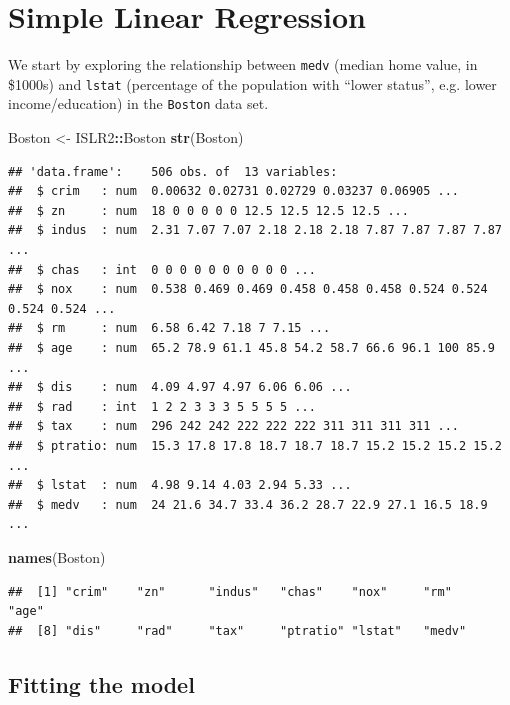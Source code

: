 \documentclass[
  11pt,
]{article}
\newenvironment{Shaded}{\begin{snugshade}}{\end{snugshade}}
\newcommand{\FunctionTok}[1]{\textcolor[rgb]{0.13,0.29,0.53}{\textbf{#1}}}
\newcommand{\NormalTok}[1]{#1}
\newcommand{\OtherTok}[1]{\textcolor[rgb]{0.56,0.35,0.01}{#1}}
\newcommand{\SpecialCharTok}[1]{\textcolor[rgb]{0.81,0.36,0.00}{\textbf{#1}}}
\begin{document}
\section{Simple Linear Regression}\label{simple-linear-regression}

We start by exploring the relationship between \texttt{medv} (median
home value, in \$1000s) and \texttt{lstat} (percentage of the population
with ``lower status'', e.g. lower income/education) in the
\texttt{Boston} data set.

\begin{Shaded}
\begin{Highlighting}[]
\NormalTok{Boston }\OtherTok{\textless{}{-}}\NormalTok{ ISLR2}\SpecialCharTok{::}\NormalTok{Boston}
\FunctionTok{str}\NormalTok{(Boston)}
\end{Highlighting}
\end{Shaded}

\begin{verbatim}
## 'data.frame':    506 obs. of  13 variables:
##  $ crim   : num  0.00632 0.02731 0.02729 0.03237 0.06905 ...
##  $ zn     : num  18 0 0 0 0 0 12.5 12.5 12.5 12.5 ...
##  $ indus  : num  2.31 7.07 7.07 2.18 2.18 2.18 7.87 7.87 7.87 7.87 ...
##  $ chas   : int  0 0 0 0 0 0 0 0 0 0 ...
##  $ nox    : num  0.538 0.469 0.469 0.458 0.458 0.458 0.524 0.524 0.524 0.524 ...
##  $ rm     : num  6.58 6.42 7.18 7 7.15 ...
##  $ age    : num  65.2 78.9 61.1 45.8 54.2 58.7 66.6 96.1 100 85.9 ...
##  $ dis    : num  4.09 4.97 4.97 6.06 6.06 ...
##  $ rad    : int  1 2 2 3 3 3 5 5 5 5 ...
##  $ tax    : num  296 242 242 222 222 222 311 311 311 311 ...
##  $ ptratio: num  15.3 17.8 17.8 18.7 18.7 18.7 15.2 15.2 15.2 15.2 ...
##  $ lstat  : num  4.98 9.14 4.03 2.94 5.33 ...
##  $ medv   : num  24 21.6 34.7 33.4 36.2 28.7 22.9 27.1 16.5 18.9 ...
\end{verbatim}

\begin{Shaded}
\begin{Highlighting}[]
\FunctionTok{names}\NormalTok{(Boston)}
\end{Highlighting}
\end{Shaded}

\begin{verbatim}
##  [1] "crim"    "zn"      "indus"   "chas"    "nox"     "rm"      "age"    
##  [8] "dis"     "rad"     "tax"     "ptratio" "lstat"   "medv"
\end{verbatim}

\subsection{Fitting the model}\label{fitting-the-model}
\end{document}
